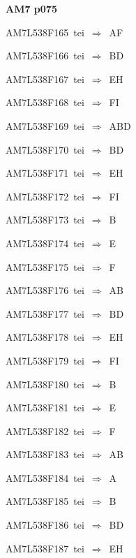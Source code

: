 \par\vfill\eject
{\bf\hfill AM7 p075\hfill\hbox{}}\par\bigskip
{\sixrm AM7L538F165\ {\sixit tei}\ }$\Rightarrow$\ AF\par\smallskip
{\sixrm AM7L538F166\ {\sixit tei}\ }$\Rightarrow$\ BD\par\smallskip
{\sixrm AM7L538F167\ {\sixit tei}\ }$\Rightarrow$\ EH\par\smallskip
{\sixrm AM7L538F168\ {\sixit tei}\ }$\Rightarrow$\ FI\par\smallskip
{\sixrm AM7L538F169\ {\sixit tei}\ }$\Rightarrow$\ ABD\par\smallskip
{\sixrm AM7L538F170\ {\sixit tei}\ }$\Rightarrow$\ BD\par\smallskip
{\sixrm AM7L538F171\ {\sixit tei}\ }$\Rightarrow$\ EH\par\smallskip
{\sixrm AM7L538F172\ {\sixit tei}\ }$\Rightarrow$\ FI\par\smallskip
{\sixrm AM7L538F173\ {\sixit tei}\ }$\Rightarrow$\ B\par\smallskip
{\sixrm AM7L538F174\ {\sixit tei}\ }$\Rightarrow$\ E\par\smallskip
{\sixrm AM7L538F175\ {\sixit tei}\ }$\Rightarrow$\ F\par\smallskip
{\sixrm AM7L538F176\ {\sixit tei}\ }$\Rightarrow$\ AB\par\smallskip
{\sixrm AM7L538F177\ {\sixit tei}\ }$\Rightarrow$\ BD\par\smallskip
{\sixrm AM7L538F178\ {\sixit tei}\ }$\Rightarrow$\ EH\par\smallskip
{\sixrm AM7L538F179\ {\sixit tei}\ }$\Rightarrow$\ FI\par\smallskip
{\sixrm AM7L538F180\ {\sixit tei}\ }$\Rightarrow$\ B\par\smallskip
{\sixrm AM7L538F181\ {\sixit tei}\ }$\Rightarrow$\ E\par\smallskip
{\sixrm AM7L538F182\ {\sixit tei}\ }$\Rightarrow$\ F\par\smallskip
{\sixrm AM7L538F183\ {\sixit tei}\ }$\Rightarrow$\ AB\par\smallskip
{\sixrm AM7L538F184\ {\sixit tei}\ }$\Rightarrow$\ A\par\smallskip
{\sixrm AM7L538F185\ {\sixit tei}\ }$\Rightarrow$\ B\par\smallskip
{\sixrm AM7L538F186\ {\sixit tei}\ }$\Rightarrow$\ BD\par\smallskip
{\sixrm AM7L538F187\ {\sixit tei}\ }$\Rightarrow$\ EH\par\smallskip
